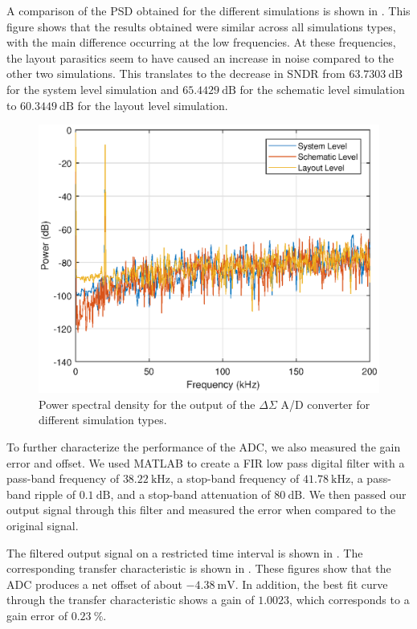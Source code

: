 \documentclass[journal,hidelinks]{IEEEtran}
\begin{document}
A comparison of the PSD obtained for the different simulations is shown in . This figure shows that the results obtained were similar across all simulations types, with the main difference occurring at the low frequencies. At these frequencies, the layout parasitics seem to have caused an increase in noise compared to the other two simulations. This translates to the decrease in SNDR from $\SI{63.7303}{\deci\bel}$ for the system level simulation and $\SI{65.4429}{\deci\bel}$ for the schematic level simulation to $\SI{60.3449}{\deci\bel}$ for the layout level simulation.

\begin{figure}[!htb]
  \centering
  \includegraphics[width=0.8\columnwidth]{circuit/comparison_psd.eps}
  \caption{Power spectral density for the output of the $\Delta \Sigma$ A/D converter for different simulation types.}
  \label{fig:comparison_psd}
\end{figure}

To further characterize the performance of the ADC, we also measured the gain error and offset. We used MATLAB to create a FIR low pass digital filter with a pass-band frequency of $\SI{38.22}{\kilo\hertz}$, a stop-band frequency of $\SI{41.78}{\kilo\hertz}$, a pass-band ripple of $\SI{0.1}{\deci\bel}$, and a stop-band attenuation of $\SI{80}{\deci\bel}$. We then passed our output signal through this filter and measured the error when compared to the original signal.

The filtered output signal on a restricted time interval is shown in . The corresponding transfer characteristic is shown in . These figures show that the ADC produces a net offset of about $\SI{-4.38}{\milli\volt}$. In addition, the best fit curve through the transfer characteristic shows a gain of $1.0023$, which corresponds to a gain error of $\SI{0.23}{\percent}$.
\end{document}
